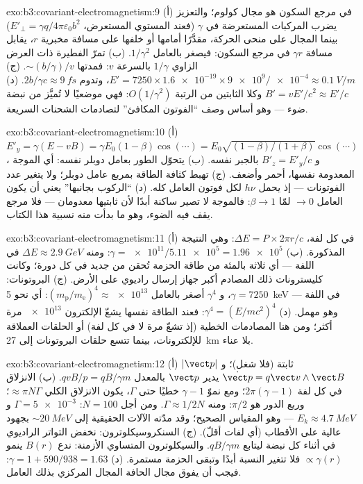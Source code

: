 \begin{solution}{exo:b3:covariant-electromagnetism:9}
(أ) في مرجع السكون هو مجال كولوم؛ والتعزيز يضرب المركبات
المستعرضة في $\gamma$ (فعند المستوي المستعرض، $E'_\perp = \gamma
q/4\pi\varepsilon_0b^2$) بينما المجال على منحى الحركة، مقدَّرًا
أمامها أو خلفها على مسافة مخبرية $r$، يقابل مسافة $\gamma r$ في مرجع السكون:
فيصغر بالعامل $1/\gamma^2$. (ب) تمرّ الفطيرة ذات العرض الزاوي
$1/\gamma$ بالسرعة $v$: فمدتها $\sim (b/\gamma)/v$. (ج)
$E' = 7250 \times \num{1.6e-19} \times \num{9e9}/\num{e-4} \approx
\qty{0.1}{V/m}$، وتدوم $2b/\gamma c \approx \qty{9}{fs}$. (د)
$B' = vE'/c^2 \approx E'/c$ وكلا الثابتين من الرتبة $O(1/\gamma^2)$:
فهي موضعيًا لا تُميَّز من نبضة ضوء --- وهو أساس
وصف ``الفوتون المكافئ'' لتصادمات الشحنات السريعة.
\end{solution}

\begin{solution}{exo:b3:covariant-electromagnetism:10}
(أ) $E'_y = \gamma(E - vB) = \gamma E_0(1 - \beta)\cos(\cdots) =
E_0\sqrt{(1-\beta)/(1+\beta)}\cos(\cdots)$، و $B'_z = E'_y/c$ بالجبر
نفسه. (ب) يتحوّل الطور بعامل دوبلر
نفسه: أي الموجة المعدومة نفسها، أحمر وأضعف. (ج) تهبط كثافة الطاقة
بمربع عامل دوبلر؛ ولا يتغير عدد الفوتونات ---
إذ يحمل $h\nu$ لكل فوتون العامل كله. (د) ``الركوب
بجانبها'' يعني أن يكون العامل $\to 0$ لمّا $\beta \to 1$: فالموجة
لا تصير ساكنة أبدًا لأن ثابتيها معدومان --- فلا
مرجع يقف فيه الضوء، وهو ما بدأت منه نسبية هذا الكتاب.
\end{solution}

\begin{solution}{exo:b3:covariant-electromagnetism:11}
(أ) في كل لفة، $\Delta E = P \times 2\pi r/c$: وهي النتيجة المذكورة. (ب)
$\gamma = \num{e11}/\num{5.11e5} = \num{1.96e5}$: ومنه $\Delta E \approx
\qty{2.9}{GeV}$ في اللفة --- أي ثلاثة بالمئة من طاقة الحزمة
تُحقن من جديد في كل دورة؛ وكانت كليسترونات ذلك المصادم أكبر جهاز
إرسال راديوي على الأرض. (ج) البروتونات: $\gamma = 7250$، و $\gamma^4$
أصغر بالعامل $(m_{\text{p}}/m_{\text{e}})^4 \approx \num{e13}$: أي نحو
\qty{5}{keV} في اللفة --- وهو مهمل. (د) $\gamma^4 = (E/mc^2)^4$:
فعند الطاقة نفسها يشعّ الإلكترون $\num{e13}$ مرة أكثر؛ ومن هنا
المصادمات الخطية (إذ تشعّ مرة لا في كل لفة) أو الحلقات العملاقة
للإلكترونات، بينما تتسع حلقات البروتونات إلى \qty{27}{km} بلا عناء.
\end{solution}

\begin{solution}{exo:b3:covariant-electromagnetism:12}
(أ) $|\vect p|$ ثابتة (فلا شغل)؛ و $\dot{\vect p} = q\vect
v\wedge\vect B$ يدير $\vect p$ بالمعدل $qvB/p = qB/\gamma m$. (ب)
الانزلاق في كل لفة $2\pi(\gamma - 1)$؛ ومع نموّ $\gamma - 1$ خطيًا
حتى $\Gamma$، يكون الانزلاق الكلي $\approx \pi N\Gamma$؛ وربع الدور
هو $\pi/2$: ومنه $\Gamma \approx 1/2N$. ومن أجل $N = 100$: $\Gamma =
\num{5e-3}$ و $E_k \approx \qty{4.7}{MeV}$ --- وهو المقياس الصحيح؛ وقد
مدّته الآلات الحقيقية إلى $\sim\qty{20}{MeV}$ بجهود عالية على الأقطاب
(أي لفات أقلّ). (ج) السنكروسيكلوترون: نخفض التواتر الراديوي في
أثناء كل نبضة ليتابع $qB/\gamma m$. والسيكلوترون المتساوي الأزمنة: ندع
$B(r)$ ينمو $\propto\gamma(r)$ فلا تتغير النسبة أبدًا وتبقى
الحزمة مستمرة. (د) $\gamma = 1 + 590/938 = 1.63$: فيجب أن يفوق مجال
الحافة المجال المركزي بذلك العامل.
\end{solution}

